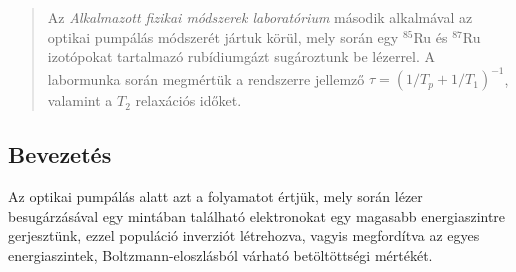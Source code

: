 \begin{abstract}
    \noindent Az \emph{Alkalmazott fizikai módszerek laboratórium} második alkalmával az optikai pumpálás módszerét jártuk körül, mely során egy $^{85}$Ru és $^{87}$Ru izotópokat tartalmazó rubídiumgázt sugároztunk be lézerrel. A labormunka során megmértük a rendszerre jellemző $\tau = \left( 1/T_{p} + 1/T_{1} \right)^{-1}$, valamint a $T_{2}$ relaxációs időket.
\end{abstract}

\begin{multicols}{2}
\section{Bevezetés}
Az optikai pumpálás alatt azt a folyamatot értjük, mely során lézer besugárzásával egy mintában található elektronokat egy magasabb energiaszintre gerjesztünk, ezzel populáció inverziót létrehozva, vagyis megfordítva az egyes energiaszintek, Boltzmann-eloszlásból várható betöltöttségi mértékét.


\end{multicols}